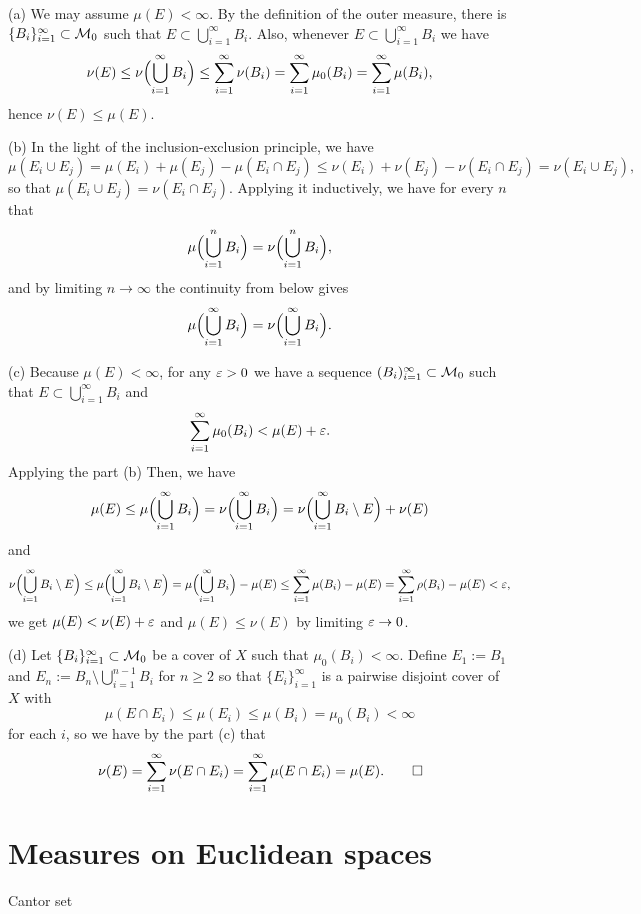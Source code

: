 \documentclass{../../large}
\begin{document}
\begin{pf}
(a)
We may assume $\mu(E)<\infty$.
By the definition of the outer measure, there is $\{B_i\}_{i=1}^\infty\subset\mathcal{M}_0$ such that $E\subset\bigcup_{i=1}^\infty B_i$.
Also, whenever $E\subset\bigcup_{i=1}^\infty B_i$ we have
\[\nu(E)\le\nu\Bigl(\bigcup_{i=1}^\infty B_i\Bigr)\le\sum_{i=1}^\infty\nu(B_i)=\sum_{i=1}^\infty\mu_0(B_i)=\sum_{i=1}^\infty\mu(B_i),\]
hence $\nu(E)\le\mu(E)$.

(b)
In the light of the inclusion-exclusion principle, we have
\[\mu(E_i\cup E_j)=\mu(E_i)+\mu(E_j)-\mu(E_i\cap E_j)\le\nu(E_i)+\nu(E_j)-\nu(E_i\cap E_j)=\nu(E_i\cup E_j),\]
so that $\mu(E_i\cup E_j)=\nu(E_i\cap E_j)$.
Applying it inductively, we have for every $n$ that
\[\mu\Bigl(\bigcup_{i=1}^nB_i\Bigr)=\nu\Bigl(\bigcup_{i=1}^nB_i\Bigr),\]
and by limiting $n\to\infty$ the continuity from below gives
\[\mu\Bigl(\bigcup_{i=1}^\infty B_i\Bigr)=\nu\Bigl(\bigcup_{i=1}^\infty B_i\Bigr).\]

(c)
Because $\mu(E)<\infty$, for any $\varepsilon>0$ we have a sequence $(B_i)_{i=1}^\infty\subset\mathcal{M}_0$ such that $E\subset\bigcup_{i=1}^\infty B_i$ and
\[\sum_{i=1}^\infty\mu_0(B_i)<\mu(E)+\varepsilon.\]
Applying the part (b) 
Then, we have
\[\mu(E)\le\mu\Bigl(\bigcup_{i=1}^\infty B_i\Bigr)=\nu\Bigl(\bigcup_{i=1}^\infty B_i\Bigr)=\nu\Bigl(\bigcup_{i=1}^\infty B_i\setminus E\Bigr)+\nu(E)\]
and
\[\nu\Bigl(\bigcup_{i=1}^\infty B_i\setminus E\Bigr)
\le\mu\Bigl(\bigcup_{i=1}^\infty B_i\setminus E\Bigr)
=\mu\Bigl(\bigcup_{i=1}^\infty B_i\Bigr)-\mu(E)
\le\sum_{i=1}^\infty\mu(B_i)-\mu(E)=\sum_{i=1}^\infty\rho(B_i)-\mu(E)<\varepsilon,\]
we get $\mu(E)<\nu(E)+\varepsilon$ and $\mu(E)\le\nu(E)$ by limiting $\varepsilon\to0$.

(d)
Let $\{B_i\}_{i=1}^\infty\subset\mathcal{M}_0$ be a cover of $X$ such that $\mu_0(B_i)<\infty$.
Define $E_1:=B_1$ and $E_n:=B_n\setminus\bigcup_{i=1}^{n-1}B_i$ for $n\ge2$ so that $\{E_i\}_{i=1}^\infty$ is a pairwise disjoint cover of $X$ with
\[\mu(E\cap E_i)\le\mu(E_i)\le\mu(B_i)=\mu_0(B_i)<\infty\]
for each $i$, so we have by the part (c) that
\[\nu(E)=\sum_{i=1}^\infty\nu(E\cap E_i)=\sum_{i=1}^\infty\mu(E\cap E_i)=\mu(E).\qedhere\]
\end{pf}



\section{Measures on Euclidean spaces}

Cantor set

\begin{prb}
\end{prb}
\end{document}
